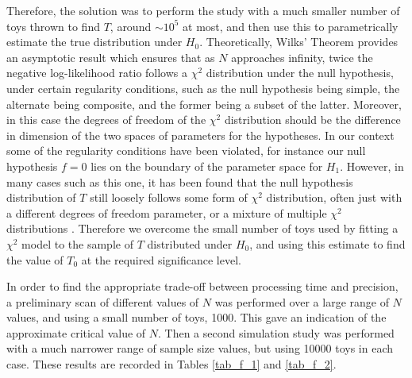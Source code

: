 \documentclass[12pt]{article}
\begin{document}
Therefore, the solution was to perform the study with a much smaller number of toys thrown to find $T$, around $\sim10^5$ at most, and then use this to parametrically estimate the true distribution under $H_0$.
Theoretically, Wilks' Theorem \cite{wilks} provides an asymptotic result which ensures that as $N$ approaches infinity, twice the negative log-likelihood ratio follows a $\chi^2$ distribution under the null hypothesis, under certain regularity conditions, such as the null hypothesis being simple, the alternate being composite, and the former being a subset of the latter.
Moreover, in this case the degrees of freedom of the $\chi^2$ distribution should be the difference in dimension of the two spaces of parameters for the hypotheses.
In our context some of the regularity conditions have been violated, for instance our null hypothesis $f=0$ lies on the boundary of the parameter space for $H_1$.
However, in many cases such as this one, it has been found that the null hypothesis distribution of $T$ still loosely follows some form of $\chi^2$ distribution, often just with a different degrees of freedom parameter, or a mixture of multiple $\chi^2$ distributions \cite{wilks_exc_1} \cite{wilks_exc_2}.
Therefore we overcome the small number of toys used by fitting a $\chi^2$ model to the sample of $T$ distributed under $H_0$, and using this estimate to find the value of $T_0$ at the required significance level.

In order to find the appropriate trade-off between processing time and precision, a preliminary scan of different values of $N$ was performed over a large range of $N$ values, and using a small number of toys, 1000.
This gave an indication of the approximate critical value of $N$.
Then a second simulation study was performed with a much narrower range of sample size values, but using 10000 toys in each case.
These results are recorded in Tables \ref{tab_f_1} and \ref{tab_f_2}.
\end{document}

